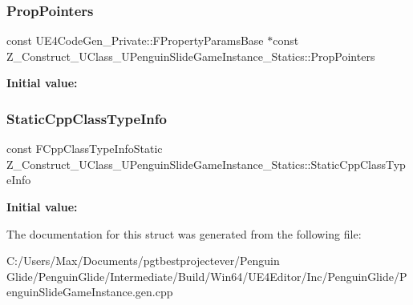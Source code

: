 \subsubsection{\texorpdfstring{PropPointers}{PropPointers}}
{\footnotesize\ttfamily const U\+E4\+Code\+Gen\+\_\+\+Private\+::\+F\+Property\+Params\+Base $\ast$const Z\+\_\+\+Construct\+\_\+\+U\+Class\+\_\+\+U\+Penguin\+Slide\+Game\+Instance\+\_\+\+Statics\+::\+Prop\+Pointers\hspace{0.3cm}{\ttfamily [static]}}

{\bfseries Initial value\+:}
\begin{DoxyCode}{0}
\DoxyCodeLine{= \{}
\DoxyCodeLine{    \}}

\end{DoxyCode}
\mbox{\label{struct_z___construct___u_class___u_penguin_slide_game_instance___statics_a4cdc74fa30aa1facc4bd5592f28e8767}} 
\subsubsection{\texorpdfstring{StaticCppClassTypeInfo}{StaticCppClassTypeInfo}}
{\footnotesize\ttfamily const F\+Cpp\+Class\+Type\+Info\+Static Z\+\_\+\+Construct\+\_\+\+U\+Class\+\_\+\+U\+Penguin\+Slide\+Game\+Instance\+\_\+\+Statics\+::\+Static\+Cpp\+Class\+Type\+Info\hspace{0.3cm}{\ttfamily [static]}}

{\bfseries Initial value\+:}
\begin{DoxyCode}{0}
\DoxyCodeLine{= \{}
\DoxyCodeLine{    \}}

\end{DoxyCode}


The documentation for this struct was generated from the following file\+:\begin{DoxyCompactItemize}
\item 
C\+:/\+Users/\+Max/\+Documents/pgtbestprojectever/\+Penguin Glide/\+Penguin\+Glide/\+Intermediate/\+Build/\+Win64/\+U\+E4\+Editor/\+Inc/\+Penguin\+Glide/Penguin\+Slide\+Game\+Instance.\+gen.\+cpp\end{DoxyCompactItemize}
